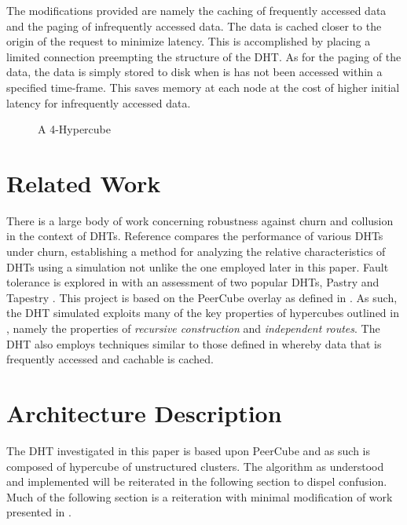 \documentclass[apa6]{IEEEtran}
\theoremstyle{plain}
\begin{document}
The modifications provided are namely the caching of frequently accessed data and the paging of infrequently accessed data. The data is cached closer to the origin of the request to minimize latency. This is accomplished by placing a limited connection preempting the structure of the DHT. As for the paging of the data, the data is simply stored to disk when is has not been accessed within a specified time-frame. This saves memory at each node at the cost of higher initial latency for infrequently accessed data.

    \begin{figure}[!t]
	    \hspace*{-0.15\linewidth}
	    \centering
		
	    \captionsetup{}
	    \caption{A 4-Hypercube}
	    \label{fig:4H}
    \end{figure}

\section{Related Work}
There is a large body of work concerning robustness against churn and collusion in the context of DHTs. Reference \cite{li_comparing_2004} compares the performance of various DHTs under churn, establishing a method for analyzing the relative characteristics of DHTs using a simulation not unlike the one employed later in this paper.  Fault tolerance is explored in \cite{hildrum_asymptotically_2003} with an assessment of two popular DHTs, Pastry \cite{rowstron_pastry:_2001} and Tapestry \cite{zhao_tapestry:_2001}. 
This project is based on the PeerCube overlay as defined in \cite{anceaume_peercube:_2008}. As such, the DHT simulated exploits many of the key properties of hypercubes outlined in \cite{saad_topological_1988}, namely the properties of \textit{recursive construction} and \textit{independent routes}. The DHT also employs techniques similar to those defined in \cite{frank_method_2000} whereby data that is frequently accessed and cachable is cached.

\blindtext


\section{Architecture Description}
The DHT investigated in this paper is based upon PeerCube \cite{anceaume_peercube:_2008} and as such is composed of hypercube of unstructured clusters. The algorithm as understood and implemented will be reiterated in the following section to dispel confusion. Much of the following section is a reiteration with minimal modification of work presented in \cite{anceaume_peercube:_2008}.
\end{document}
